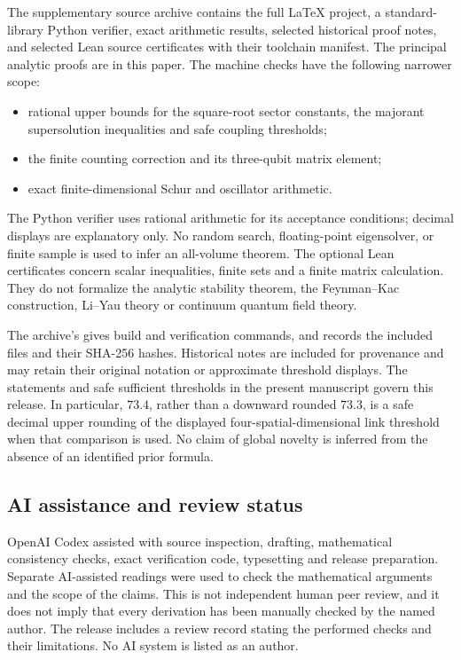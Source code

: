 The supplementary source archive contains the full \LaTeX{} project,
a standard-library Python verifier, exact arithmetic results, selected
historical proof notes, and selected Lean source certificates with their
toolchain manifest. The principal analytic proofs are in this paper.
The machine checks have the following narrower scope:
\begin{itemize}
\item rational upper bounds for the square-root sector constants,
the majorant supersolution inequalities and safe coupling thresholds;
\item the finite counting correction and its three-qubit matrix element;
\item exact finite-dimensional Schur and oscillator arithmetic.
\end{itemize}
The Python verifier uses rational arithmetic for its acceptance
conditions; decimal displays are explanatory only. No random search,
floating-point eigensolver, or finite sample is used to infer an
all-volume theorem. The optional Lean certificates concern scalar
inequalities, finite sets and a finite matrix calculation. They do not
formalize the analytic stability theorem, the Feynman--Kac construction,
Li--Yau theory or continuum quantum field theory.

The archive's  gives build and verification commands,
and  records the included files and their SHA-256
hashes. Historical notes are included for provenance and may retain
their original notation or approximate threshold displays. The
statements and safe sufficient thresholds in the present manuscript
govern this release. In particular, $73.4$, rather than a downward
rounded $73.3$, is a safe decimal upper rounding of the displayed
four-spatial-dimensional link threshold when that comparison is used.
No claim of global novelty is inferred from the absence of an identified
prior formula.

\subsection*{AI assistance and review status}

OpenAI Codex assisted with source inspection, drafting, mathematical
consistency checks, exact verification code, typesetting and release
preparation. Separate AI-assisted readings were used to check the
mathematical arguments and the scope of the claims. This is not
independent human peer review, and it does not imply that every
derivation has been manually checked by the named author. The release
includes a review record stating the performed checks and their
limitations. No AI system is listed as an author.

